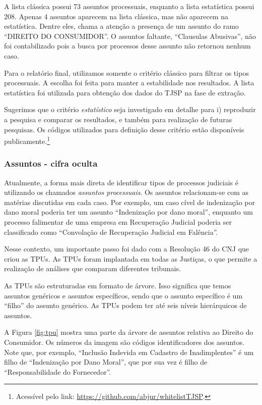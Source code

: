 \documentclass[]{report}
\begin{document}
A lista clássica possui 73 assuntos processuais, enquanto a lista
estatística possui 208. Apenas 4 assuntos aparecem na lista clássica,
mas não aparecem na estatística. Dentre eles, chama a atenção a presença
de um assunto do ramo ``DIREITO DO CONSUMIDOR''. O assuntos faltante,
``Clausulas Abusivas'', não foi contabilizado pois a busca por processos
desse assunto não retornou nenhum caso.

Para o relatório final, utilizamos somente o critério clássico para
filtrar os tipos processuais. A escolha foi feita para manter a
estabilidade nos resultados. A lista estatística foi utilizada para
obtenção dos dados do TJSP na fase de extração.

Sugerimos que o critério \emph{estatístico} seja investigado em detalhe
para i) reproduzir a pesquisa e comparar os resultados, e também para
realização de futuras pesquisas. Os códigos utilizados para definição
desse critério estão disponíveis publicamente.\footnote{Acessível pelo
  link: \url{https://github.com/abjur/whitelistTJSP}.}

\subsubsection{Assuntos - cifra oculta}\label{assuntos2}

Atualmente, a forma mais direta de identificar tipos de processos
judiciais é utilizando os chamados \emph{assuntos processuais}. Os
assuntos relacionam-se com as matérias discutidas em cada caso. Por
exemplo, um caso cível de indenização por dano moral poderia ter um
assunto ``Indenização por dano moral'', enquanto um processo falimentar
de uma empresa em Recuperação Judicial poderia ser classificado como
``Convolação de Recuperação Judicial em Falência''.

Nesse contexto, um importante passo foi dado com a Resolução 46 do CNJ
que criou as TPUs. As TPUs foram implantada em todas as Justiças, o que
permite a realização de análises que comparam diferentes tribunais.

As TPUs são estruturadas em formato de árvore. Isso significa que temos
assuntos genéricos e assuntos específicos, sendo que o assunto
específico é um ``filho'' do assunto genérico. As TPUs podem ter até
seis níveis hierárquicos de assuntos.

A Figura \ref{fig:tpu} mostra uma parte da árvore de assuntos relativa
ao Direito do Consumidor. Os números da imagem são códigos
identificadores dos assuntos. Note que, por exemplo, ``Inclusão Indevida
em Cadastro de Inadimplentes'' é um filho de ``Indenização por Dano
Moral'', que por sua vez é filho de ``Responsabilidade do Fornecedor''.
\end{document}
